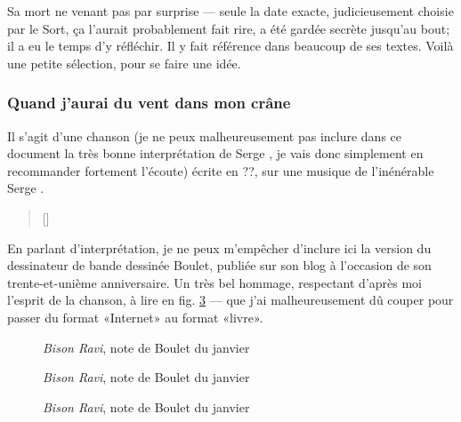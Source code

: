 Sa mort ne venant pas par surprise --- seule la date exacte,
judicieusement choisie par le Sort, ça l'aurait probablement fait rire,
a été gardée secrète jusqu'au bout; il a eu le temps d'y réfléchir. Il y
fait référence dans beaucoup de ses textes. Voilà une petite sélection,
pour se faire une idée.

\subsubsection{Quand j'aurai du vent dans mon crâne}

Il s'agit d'une chanson (je ne peux malheureusement pas inclure dans ce document
la très bonne interprétation de Serge , je vais donc simplement
en recommander fortement l'écoute) écrite en ??, sur une musique de l'inénérable Serge .

\begin{multicols}{2}
{\footnotesize
\settowidth{\versewidth}{Quand j'aurai du vent dans mon crâne}
\begin{verse}[\versewidth]

\end{verse}
}
\end{multicols}

En parlant d'interprétation, je ne peux m'empêcher d'inclure ici la version
du dessinateur de bande dessinée Boulet, publiée sur son blog à l'occasion
de son trente-et-unième anniversaire. Un très bel hommage, respectant
d'après moi l'esprit de la chanson, à lire en fig. \ref{boulet}%
--- que j'ai malheureusement dû couper pour passer du format «Internet» au format «livre».

\begin{figure}[!htb]
\centering
{}
\caption{\emph{Bison Ravi}, note de Boulet du  janvier }
\label{boulet}
\end{figure}
\begin{figure}[!htb]
\ContinuedFloat
\centering
{}
\caption{\emph{Bison Ravi}, note de Boulet du  janvier }
\label{boulet}
\end{figure}
\eject
\begin{figure}[!htb]
\ContinuedFloat
\centering
{}
\caption{\emph{Bison Ravi}, note de Boulet du  janvier }
\label{boulet}
\end{figure}
\eject
\FloatBarrier

